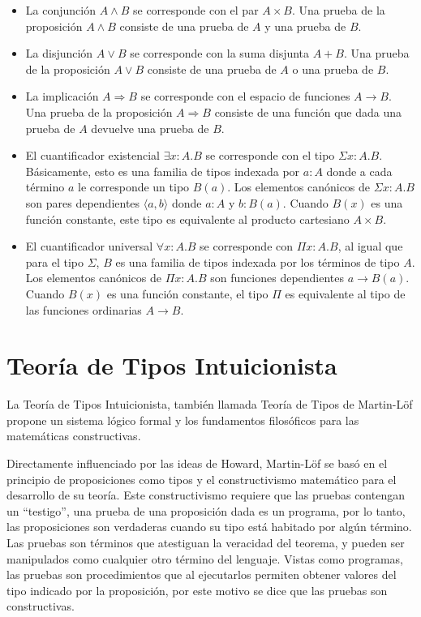 \begin{itemize}
	\item La conjunción $A \wedge B$ se corresponde con el par $A \times B$.
	Una prueba de la proposición $A \wedge B$ consiste de una prueba de $A$ y una prueba de $B$.
	
	\item La disjunción $A \vee B$ se corresponde con la suma disjunta $A + B$.
	Una prueba de la proposición $A \vee B$ consiste de una prueba de $A$ o una prueba de $B$.
	
	\item La implicación $A \Rightarrow B$ se corresponde con el espacio de funciones $A \rightarrow B$.
	Una prueba de la proposición $A \Rightarrow B$ consiste de una función que dada una prueba de $A$ devuelve una prueba de $B$.
	
	\item El cuantificador existencial $\exists x:A.B$ se corresponde con el tipo $\Sigma x:A.B$.
	Básicamente, esto es una familia de tipos indexada por $a : A$ donde a cada término $a$ le corresponde un tipo $B(a)$.
	Los elementos canónicos de $\Sigma x:A.B$ son pares dependientes $\langle a, b \rangle$ donde $a:A$ y $b:B(a)$.
	Cuando $B(x)$ es una función constante, este tipo es equivalente al producto cartesiano $A \times B$.
	
	
	\item El cuantificador universal $\forall x:A.B$ se corresponde con $\Pi x:A.B$, al igual que para el tipo $\Sigma$, $B$ es una familia de tipos indexada por los términos de tipo $A$.
	Los elementos canónicos de $\Pi x:A.B$ son funciones dependientes $a \rightarrow B(a)$.
	Cuando $B(x)$ es una función constante, el tipo $\Pi$ es equivalente al tipo de las funciones ordinarias $A \rightarrow B$.
\end{itemize}


\section{Teoría de Tipos Intuicionista}
La Teoría de Tipos Intuicionista, también llamada Teoría de Tipos de Martin-Löf \cite{MLTT72, MLTT73, MLTT79, Bibliopolis} propone un sistema lógico formal y los fundamentos filosóficos para las matemáticas constructivas.

Directamente influenciado por las ideas de Howard, Martin-Löf se basó en el principio de proposiciones como tipos y el constructivismo matemático para el desarrollo de su teoría.
Este constructivismo requiere que las pruebas contengan un ``testigo'', una prueba de una proposición dada es un programa, por lo tanto, las proposiciones son verdaderas cuando su tipo está habitado por algún término.
Las pruebas son términos que atestiguan la veracidad del teorema, y pueden ser manipulados como cualquier otro término del lenguaje.
Vistas como programas, las pruebas son procedimientos que al ejecutarlos permiten obtener valores del tipo indicado por la proposición, por este motivo se dice que las pruebas son constructivas.

